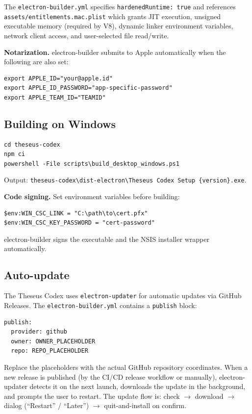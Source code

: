 \documentclass[11pt,letterpaper]{article}
\newcommand{\file}[1]{\texttt{#1}}
\newcommand{\cmd}[1]{\texttt{#1}}
\begin{document}
The \file{electron-builder.yml} specifies \cmd{hardenedRuntime: true} and references \file{assets/entitlements.mac.plist} which grants JIT execution, unsigned executable memory (required by V8), dynamic linker environment variables, network client access, and user-selected file read/write.

\textbf{Notarization.} electron-builder submits to Apple automatically when the following are also set:
\begin{lstlisting}
export APPLE_ID="your@apple.id"
export APPLE_ID_PASSWORD="app-specific-password"
export APPLE_TEAM_ID="TEAMID"
\end{lstlisting}

\subsection{Building on Windows}

\begin{lstlisting}
cd theseus-codex
npm ci
powershell -File scripts\build_desktop_windows.ps1
\end{lstlisting}

Output: \file{theseus-codex\textbackslash dist-electron\textbackslash Theseus Codex Setup \{version\}.exe}.

\textbf{Code signing.} Set environment variables before building:
\begin{lstlisting}
$env:WIN_CSC_LINK = "C:\path\to\cert.pfx"
$env:WIN_CSC_KEY_PASSWORD = "cert-password"
\end{lstlisting}

electron-builder signs the executable and the NSIS installer wrapper automatically.

\subsection{Auto-update}

The Theseus Codex uses \cmd{electron-updater} for automatic updates via GitHub Releases. The \file{electron-builder.yml} contains a \cmd{publish} block:
\begin{lstlisting}
publish:
  provider: github
  owner: OWNER_PLACEHOLDER
  repo: REPO_PLACEHOLDER
\end{lstlisting}

Replace the placeholders with the actual GitHub repository coordinates. When a new release is published (by the CI/CD release workflow or manually), electron-updater detects it on the next launch, downloads the update in the background, and prompts the user to restart. The update flow is: check $\to$ download $\to$ dialog (``Restart'' / ``Later'') $\to$ quit-and-install on confirm.
\end{document}
